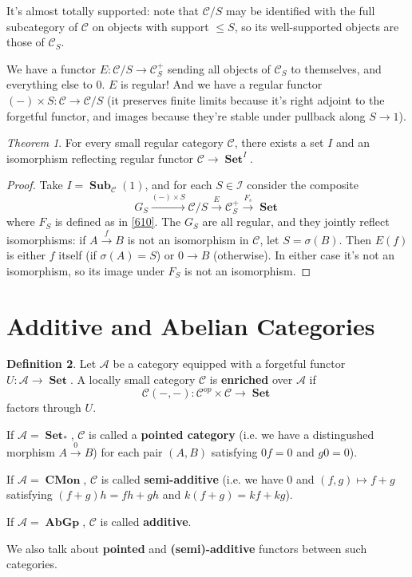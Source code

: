 \documentclass[a4paper]{article}
\theoremstyle{definition}
\newtheorem{definition}{Definition}
\theoremstyle{remark}
\theoremstyle{default}
\newtheorem{theorem}[definition]{Theorem}
\numberwithin{definition}{section}
\DeclareMathOperator{\Set}{\textbf{Set}}
\DeclareMathOperator{\Sub}{\textbf{Sub}}
\DeclareMathOperator{\CMon}{\textbf{CMon}}
\DeclareMathOperator{\AbGp}{\textbf{AbGp}}
\begin{document}
It's almost totally supported: note that $\mathcal{C}/S$ may be identified with the full subcategory of $\mathcal{C}$ on objects with support $\leq S$,
so its well-supported objects are those of $\mathcal{C}_S$.

We have a functor $E: \mathcal{C}/S \to \mathcal{C}_S^+$ sending all objects of $\mathcal{C}_S$ to themselves,
and everything else to 0.
$E$ is regular!
And we have a regular functor $(-) \times S : \mathcal{C} \to \mathcal{C}/S$ (it preserves finite limits because it's right adjoint to the forgetful functor,
and images because they're stable under pullback along $S \to 1$).

\begin{theorem}
	For every small regular category $\mathcal{C}$,
	there exists a set $I$ and an isomorphism reflecting regular functor $\mathcal{C} \to \Set^I$.
\end{theorem}
\begin{proof}
	Take $I = \Sub_\mathcal{C}(1)$,
	and for each $S \in \mathcal{I}$ consider the composite
	$$G_S \overset{(-) \times S}{\longrightarrow} \mathcal{C}/S \overset{E}{\to} \mathcal{C}_S^+ \overset{F_s}{\longrightarrow} \Set$$
	where $F_S$ is defined as in \ref{610}.
	The $G_S$ are all regular,
	and they jointly reflect isomorphisms:
	if $A \overset{f}{\to} B$ is not an isomorphism in $\mathcal{C}$,
	let $S = \sigma(B)$.
	Then $E(f)$ is either $f$ itself (if $\sigma(A)=S$)
	or $0 \to B$ (otherwise).
	In either case it's not an isomorphism, so its image under $F_S$ is not an isomorphism.
\end{proof}

\section{Additive and Abelian Categories}
\begin{definition}
	Let $\mathcal{A}$ be a category equipped with a forgetful functor $U: \mathcal{A} \to \Set$.
	A locally small category $\mathcal{C}$ is \textbf{enriched} over $\mathcal{A}$ if
	$$\mathcal{C}(-, -): \mathcal{C}^{op} \times \mathcal{C} \to \Set$$
	factors through $U$.
	
	If $\mathcal{A} = \Set_*$,
	$\mathcal{C}$ is called a \textbf{pointed category}
	(i.e. we have a distingushed morphism $A \overset{0}{\to} B$) for each pair $(A, B)$ satisfying $0f = 0$ and $g0 = 0$).
	
	If $\mathcal{A} = \CMon$,
	$\mathcal{C}$ is called \textbf{semi-additive}
	(i.e. we have 0 and $(f, g) \mapsto f+g$ satisfying $(f+g)h = fh+gh$ and $k(f+g) = kf + kg$).
	
	If $\mathcal{A} = \AbGp$, $\mathcal{C}$ is called \textbf{additive}.
	
	We also talk about \textbf{pointed} and \textbf{(semi)-additive} functors between such categories.
\end{definition}
\end{document}
